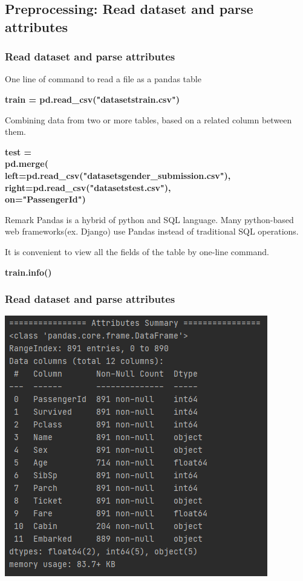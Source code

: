 \documentclass{beamer}
\begin{document}
\subsection{Preprocessing: Read dataset and parse attributes}
\begin{frame}
	\frametitle{Read dataset and parse attributes}
	\begin{flushleft}
		One line of command to read a file as a pandas table
	\end{flushleft}
	\begin{center}
		\textbf{\color{blue}\footnotesize train = pd.read\_csv("datasets\/train.csv")}
	\end{center}
	\begin{flushleft}
		Combining data from two or more tables, based on a related column between them.
	\end{flushleft}
	\begin{center}
		\textbf{\color{blue} \footnotesize
			test = pd.merge(~~~~~~~~~~~~~~~~~~~~~~~~~~~~~~~~~~~~~~~~~~~~~~~~~~~ \\
			left=pd.read\_csv("datasets\/gender\_submission.csv"), \\
			right=pd.read\_csv("datasets\/test.csv"),~~~~~~~~~~~~~~~~~ \\
			on="PassengerId")~~~~~~~~~~~~~~~~~~~~~~~~~~~~~~~~~~~~~~~~ 
		}
	\end{center}
	\begin{block}{Remark}
	Pandas is a hybrid of python and SQL language. Many python-based web frameworks(ex. Django) use Pandas instead of traditional SQL operations.
	\end{block}
	\begin{flushleft}
		It is convenient to view all the fields of the table by one-line command.
	\end{flushleft}
	\begin{center}
		\textbf{\color{blue}\footnotesize train.info()}
	\end{center}
\end{frame}

\begin{frame}
	\frametitle{Read dataset and parse attributes}
	\begin{center}
		\includegraphics[width=0.6\linewidth]{./src/figures/1.png}
	\end{center}
\end{frame}
\end{document}
